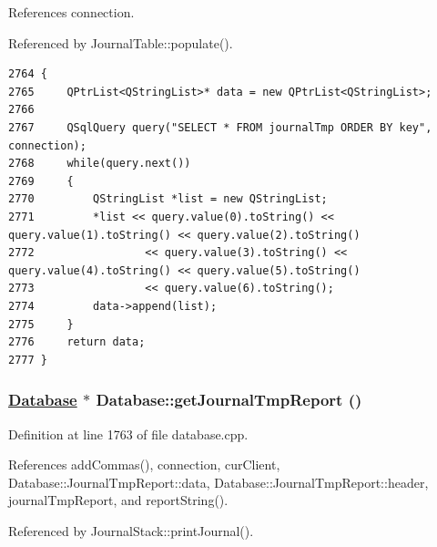 References connection.

Referenced by Journal\-Table::populate().

\footnotesize\begin{verbatim}2764 {
2765     QPtrList<QStringList>* data = new QPtrList<QStringList>;
2766     
2767     QSqlQuery query("SELECT * FROM journalTmp ORDER BY key", connection);
2768     while(query.next())
2769     {
2770         QStringList *list = new QStringList;
2771         *list << query.value(0).toString() << query.value(1).toString() << query.value(2).toString()
2772                 << query.value(3).toString() << query.value(4).toString() << query.value(5).toString()
2773                 << query.value(6).toString();
2774         data->append(list);
2775     }
2776     return data;
2777 }
\end{verbatim}\normalsize 


\hypertarget{classDatabase_a26}{
\subsubsection[getJournalTmpReport]{\setlength{\rightskip}{0pt plus 5cm}\hyperlink{classDatabase}{Database} $\ast$ Database::get\-Journal\-Tmp\-Report ()}}
\label{classDatabase_a26}


Definition at line 1763 of file database.cpp.

References add\-Commas(), connection, cur\-Client, Database::Journal\-Tmp\-Report::data, Database::Journal\-Tmp\-Report::header, journal\-Tmp\-Report, and report\-String().

Referenced by Journal\-Stack::print\-Journal().

